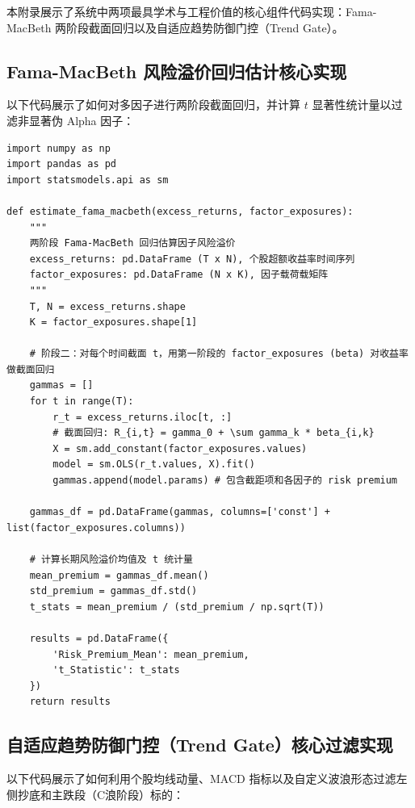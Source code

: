 \documentclass[11pt,a4paper]{article}
\begin{document}
本附录展示了系统中两项最具学术与工程价值的核心组件代码实现：Fama-MacBeth 两阶段截面回归以及自适应趋势防御门控（Trend Gate）。

\subsection{Fama-MacBeth 风险溢价回归估计核心实现}
以下代码展示了如何对多因子进行两阶段截面回归，并计算 $t$ 显著性统计量以过滤非显著伪 Alpha 因子：

\begin{lstlisting}
import numpy as np
import pandas as pd
import statsmodels.api as sm

def estimate_fama_macbeth(excess_returns, factor_exposures):
    """
    两阶段 Fama-MacBeth 回归估算因子风险溢价
    excess_returns: pd.DataFrame (T x N), 个股超额收益率时间序列
    factor_exposures: pd.DataFrame (N x K), 因子载荷载矩阵
    """
    T, N = excess_returns.shape
    K = factor_exposures.shape[1]
    
    # 阶段二：对每个时间截面 t，用第一阶段的 factor_exposures (beta) 对收益率做截面回归
    gammas = []
    for t in range(T):
        r_t = excess_returns.iloc[t, :]
        # 截面回归: R_{i,t} = gamma_0 + \sum gamma_k * beta_{i,k}
        X = sm.add_constant(factor_exposures.values)
        model = sm.OLS(r_t.values, X).fit()
        gammas.append(model.params) # 包含截距项和各因子的 risk premium
        
    gammas_df = pd.DataFrame(gammas, columns=['const'] + list(factor_exposures.columns))
    
    # 计算长期风险溢价均值及 t 统计量
    mean_premium = gammas_df.mean()
    std_premium = gammas_df.std()
    t_stats = mean_premium / (std_premium / np.sqrt(T))
    
    results = pd.DataFrame({
        'Risk_Premium_Mean': mean_premium,
        't_Statistic': t_stats
    })
    return results
\end{lstlisting}

\subsection{自适应趋势防御门控（Trend Gate）核心过滤实现}
以下代码展示了如何利用个股均线动量、MACD 指标以及自定义波浪形态过滤左侧抄底和主跌段（C浪阶段）标的：
\end{document}
